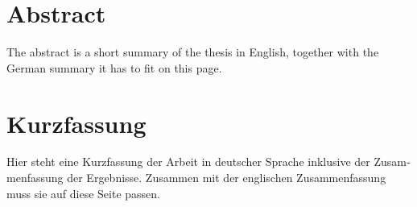 \thispagestyle{plain}

\section*{Abstract}
The abstract is a short summary of the thesis in English, together with the German summary it has to fit on this page.

\section*{Kurzfassung}
\begin{german}
Hier steht eine Kurzfassung der Arbeit in deutscher Sprache inklusive der Zusammenfassung der
Ergebnisse.
Zusammen mit der englischen Zusammenfassung muss sie auf diese Seite passen.
\end{german}

